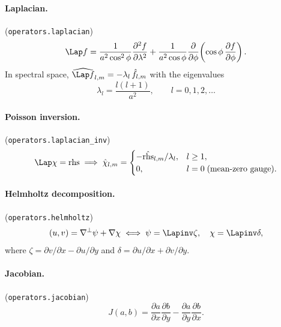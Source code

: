 \paragraph{Laplacian.} (\texttt{operators.laplacian})
\begin{equation}
\Lap f = \frac{1}{a^{2}\cos^{2}\phi}\frac{\partial^{2}f}{\partial\lambda^{2}}
       + \frac{1}{a^{2}\cos\phi}\frac{\partial}{\partial\phi}\!
         \left(\cos\phi\,\frac{\partial f}{\partial\phi}\right).
\end{equation}
In spectral space, $\widehat{\Lap f}_{l,m}=-\lambda_l\,\hat f_{l,m}$
with the eigenvalues
\begin{equation}
\lambda_l=\frac{l(l+1)}{a^{2}},\qquad l=0,1,2,\ldots
\label{eq:laplacian_eigs}
\end{equation}

\paragraph{Poisson inversion.} (\texttt{operators.laplacian\_inv})
\begin{equation}
\Lap\chi=\mathrm{rhs}\;\Longrightarrow\;
\hat\chi_{l,m}=
\begin{cases}
  -\hat{\mathrm{rhs}}_{l,m}/\lambda_l, & l\geq 1,\\
  0,                                    & l=0\;\text{(mean-zero gauge)}.
\end{cases}
\label{eq:laplacian_inv}
\end{equation}

\paragraph{Helmholtz decomposition.} (\texttt{operators.helmholtz})
\begin{equation}
(u,v) = \nabla^{\perp}\psi + \nabla\chi
\;\Longleftrightarrow\;
\psi=\Lapinv\zeta,\quad \chi=\Lapinv\delta,
\end{equation}
where $\zeta=\partial v/\partial x-\partial u/\partial y$ and
$\delta=\partial u/\partial x+\partial v/\partial y$.

\paragraph{Jacobian.} (\texttt{operators.jacobian})
\begin{equation}
J(a,b)=\frac{\partial a}{\partial x}\frac{\partial b}{\partial y}
      -\frac{\partial a}{\partial y}\frac{\partial b}{\partial x}.
\end{equation}


